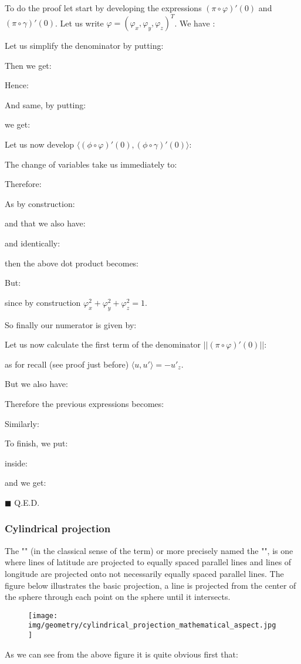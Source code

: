 	\begin{dem}
	To do the proof let start by developing the expressions $(\pi\circ\varphi)'(0)$ and $(\pi\circ\gamma)'(0)$. Let us write $\varphi=(\varphi_x,\varphi_y,\varphi_z)^T$. We have :
	
	Let us simplify the denominator by putting:
	
	Then we get:
	
	Hence:
	
	And same, by putting:
	
	we get:
	
	Let us now develop $\langle (\phi\circ\varphi)'(0),(\phi\circ\gamma)'(0)\rangle$:
	
	The change of variables take us immediately to:
	
	Therefore:
	
	As by construction:
	
	and that we also have:
	
	and identically:
	
	then the above dot product becomes:
	
	But:
	
	since by construction $\varphi_x^2+\varphi_y^2+\varphi_z^2=1$.
	
	So finally our numerator is given by:
	
	Let us now calculate the first term of the denominator $||(\pi\circ\varphi)'(0)||$:
	
	as for recall (see proof just before) $\langle u,u'\rangle=-{u'}_z$.
	
	But we also have:
	
	Therefore the previous expressions becomes:
	
	Similarly:
	
	To finish, we put:
	
	inside:
	
	and we get:
	
	\begin{flushright}
		$\blacksquare$  Q.E.D.
	\end{flushright}
	\end{dem}
	
	\pagebreak
	\subsubsection{Cylindrical projection}
	The "" (in the classical sense of the term) or more precisely named the "", is one where lines of latitude are projected to equally spaced parallel lines and lines of longitude are projected onto not necessarily equally spaced parallel lines. The figure below illustrates the basic projection, a line is projected from the center of the sphere through each point on the sphere until it intersects.
	\begin{figure}[H]
		\centering
		\texttt{[image: img/geometry/cylindrical\_projection\_mathematical\_aspect.jpg]}
	\end{figure}
	As we can see from the above figure it is quite obvious first that:
	
